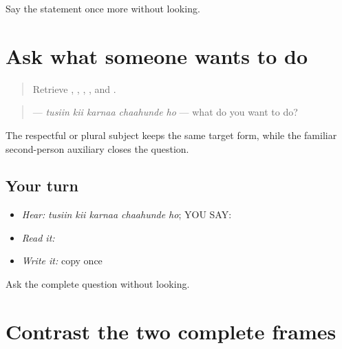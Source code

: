 \begin{tcolorbox}[breakable,colback=teal!4,colframe=teal!35!black,title={Before you move on}]
Say the statement once more without looking.
\end{tcolorbox}
\section[\texorpdfstring{\pa{ਤੁਸੀਂ} \pa{ਕੀ} \pa{ਕਰਨਾ} \pa{ਚਾਹੁੰਦੇ} \pa{ਹੋ} (tusiin kii …)}{ਤੁਸੀਂ ਕੀ ਕਰਨਾ ਚਾਹੁੰਦੇ ਹੋ (tusiin kii …)}]{Ask what someone wants to do}

\label{lesson:PA-C189-chahunde-ho}



\begin{quote}
Retrieve \textbf{}, \textbf{}, \textbf{}, \textbf{}, and \textbf{}.
\end{quote}

\begin{grammarlens}[title={Grammar Lens: complete question}]
\begin{quote}
\textbf{    } — \emph{tusiin kii karnaa chaahunde ho} — what do you want to do?
\end{quote}

The respectful or plural subject keeps the same target form, while the familiar second-person auxiliary closes the question.
\end{grammarlens}

\subsection*{Your turn}
\begin{itemize}
\raggedright
  \item \emph{Hear:} \emph{tusiin kii karnaa chaahunde ho}; YOU SAY: \textbf{    }
  \item \emph{Read it:} \textbf{    }
  \item \emph{Write it:} copy \textbf{ } once
\end{itemize}

\begin{tcolorbox}[breakable,colback=teal!4,colframe=teal!35!black,title={Before you move on}]
Ask the complete question without looking.
\end{tcolorbox}
\section[\texorpdfstring{\pa{ਉਹ} \pa{ਕੰਮ} \pa{ਕਰਨਾ} \pa{ਚਾਹੁੰਦੇ} … (oh kamm karnaa …)}{ਉਹ ਕੰਮ ਕਰਨਾ ਚਾਹੁੰਦੇ … (oh kamm karnaa …)}]{Contrast the two complete frames}

